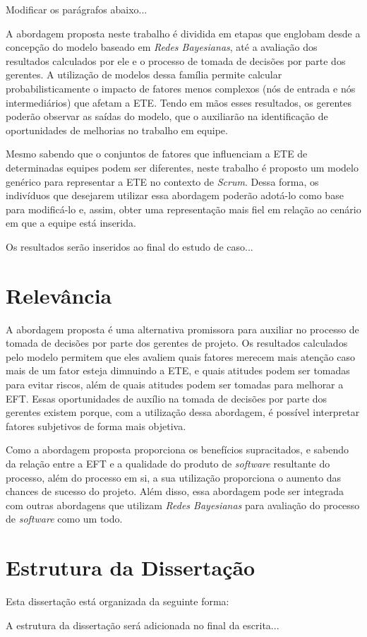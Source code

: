 {\color{red} Modificar os parágrafos abaixo...}

A abordagem proposta neste trabalho é dividida em etapas que englobam desde a concepção do modelo baseado em \textit{Redes Bayesianas}, até a avaliação dos resultados calculados por ele e o processo de tomada de decisões por parte dos gerentes. A utilização de modelos dessa família permite calcular probabilisticamente o impacto de fatores menos complexos (nós de entrada e nós intermediários) que afetam a ETE. Tendo em mãos esses resultados, os gerentes poderão observar as saídas do modelo, que o auxiliarão na identificação de oportunidades de melhorias no trabalho em equipe.

Mesmo sabendo que o conjuntos de fatores que influenciam a ETE de determinadas equipes podem ser diferentes, neste trabalho é proposto um modelo genérico para representar a ETE no contexto de \textit{Scrum}. Dessa forma, os indivíduos que desejarem utilizar essa abordagem poderão adotá-lo como base para modificá-lo e, assim, obter uma representação mais fiel em relação ao cenário em que a equipe está inserida.

{\color{red} Os resultados serão inseridos ao final do estudo de caso...}

\section{Relevância}
\label{introducao:relevancia}

A abordagem proposta é uma alternativa promissora para auxiliar no processo de tomada de decisões por parte dos gerentes de projeto. Os resultados calculados pelo modelo permitem que eles avaliem quais fatores merecem mais atenção caso mais de um fator esteja dimnuindo a ETE, e quais atitudes podem ser tomadas para evitar riscos, além de quais atitudes podem ser tomadas para melhorar a EFT. Essas oportunidades de auxílio na tomada de decisões por parte dos gerentes existem porque, com a utilização dessa abordagem, é possível interpretar fatores subjetivos de forma mais objetiva.

Como a abordagem proposta proporciona os benefícios supracitados, e sabendo da relação entre a EFT e a qualidade do produto de \textit{software} resultante do processo, além do processo em si, a sua utilização proporciona o aumento das chances de sucesso do projeto. Além disso, essa abordagem pode ser integrada com outras abordagens que utilizam \textit{Redes Bayesianas} para avaliação do processo de \textit{software} como um todo.

\section{Estrutura da Dissertação}
\label{introducao:estrutura}

Esta dissertação está organizada da seguinte forma:

{\color{red} A estrutura da dissertação será adicionada no final da escrita...}
